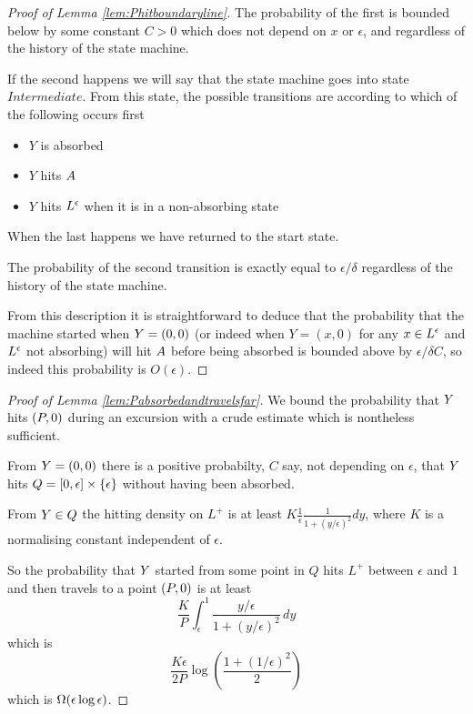 {\begin{proof}[Proof of Lemma \ref{lem:Phitboundaryline}]
The probability of the first is bounded below by some constant $C > 0$
which does not depend on $x$ or $\epsilon$, and regardless of the
history of the state machine.

\newcommand{\stateintermediate}{Intermediate}

If the second happens we will say that the state machine goes into
state $\stateintermediate$.  From this state, the possible transitions
are according to which of the following occurs first

\begin{itemize}
\item $Y$ is absorbed
\item $Y$ hits $A$
\item $Y$ hits $L^\epsilon$ when it is in a non-absorbing state
\end{itemize}

When the last happens we have returned to the start state.

The probability of the second transition is exactly equal to
$\epsilon/\delta$ regardless of the history of the state machine.

From this description it is straightforward to deduce that the
probability that the machine started when $Y = (0,0)$ (or indeed when
$Y = (x, 0)$ for any $x \in L^\epsilon$ and $L^\epsilon$ not absorbing) will hit
$A$ before being absorbed is
bounded above by $\epsilon/\delta C$, so indeed this probability is
$O(\epsilon)$.
\end{proof}

\begin{proof}[Proof of Lemma \ref{lem:Pabsorbedandtravelsfar}]
We bound the probability that $Y$ hits $(P,0)$ during an
excursion with a crude estimate which is nontheless sufficient.

From $Y = (0,0)$ there is a positive probabilty, $C$ say, not
depending on $\epsilon$, that $Y$ hits $Q = [0, \epsilon] \times
\{\epsilon\}$ without having been absorbed.

From $Y \in Q$ the hitting density on $L^+$ is at least $K
\frac{1}{\epsilon} \frac{1}{1 + (y/\epsilon)^2} dy$, where $K$ is a
normalising constant independent of $\epsilon$.

So the probability that $Y$ started from some point in $Q$ hits $L^+$
between $\epsilon$ and $1$ and then travels to a point $(P,0)$ is at least
\[
\frac{K}{P} \int_{\epsilon}^{1} \frac{y/\epsilon}{1 + (y/\epsilon)^2}
\, dy
\]
which is
\[
\frac{K\epsilon}{2P} \log\left(\frac{1 + (1/\epsilon)^2}{2}\right)
\]
which is $\Omega(\epsilon\log\epsilon)$.
\end{proof}
}
